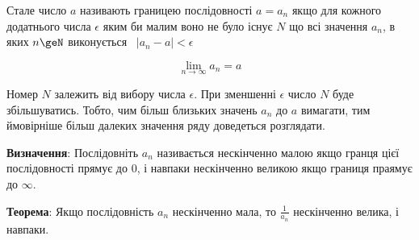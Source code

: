 \begin{center}\Large{}\end{center}

Стале число $a$ називають границею послідовності $a=a_n$ якщо для кожного додатнього числа $\epsilon$ яким би малим воно не було існує $N$ що всі значення $a_n$, в яких $n\geN$ виконується \mbox{ $|a_n - a| < \epsilon$}

\begin{displaymath}
  \lim_{n \to \infty} a_n  = a
\end{displaymath}

Номер $N$ залежить від вибору числа $\epsilon$. При зменшенні $\epsilon$ число  $N$ буде збільшуватись. Тобто, чим більш близьких значень $a_n$ до $a$ вимагати, тим ймовірніше більш далеких значення ряду доведеться розглядати.

\begin{teorem}
\noindent\textbf{Визначення}: Послідовніть $a_n$ називається нескінченно малою якщо гранця цієї послідовності прямує до 0, і навпаки нескінченно великою якщо границя праямує до $\infty$.
\end{teorem}

\begin{teorem}
\noindent\textbf{Теорема}: Якщо послідовність $a_n$ нескінченно мала, то $\frac{1}{a_n}$ нескінченно велика, і навпаки.
\end{teorem}
